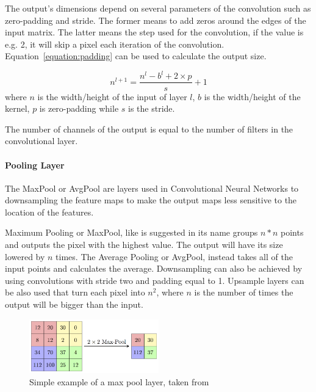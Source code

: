The output's dimensions depend on several parameters of the convolution such as
zero-padding and stride. The former means to add zeros around the edges of the
input matrix. The latter means the step used for the convolution, if the value
is e.g. 2, it will skip a pixel each iteration of the convolution.
Equation~\ref{equation:padding} can be used to calculate the output size.

\begin{equation} \label{equation:padding}
     n^{l+1} = \frac{n^{l}- b^{l}+2 \times p}{s} + 1
\end{equation}
where $n$ is the width/height of the input of layer $l$, $ b$ is the
width/height of the kernel, $p$ is zero-padding while $s$ is the stride.

The number of channels of the output is equal to the number of filters in the
convolutional layer.


\paragraph{Pooling Layer}

The MaxPool or AvgPool are layers used in Convolutional Neural Networks to
downsampling the feature maps to make the output maps less sensitive to the
location of the features.

Maximum Pooling or MaxPool, like is suggested in its name groups $ n * n $
points and outputs the pixel with the highest value.  The output will have its size
lowered by $n$ times.  The Average Pooling or AvgPool, instead takes all of
the input points and calculates the average. Downsampling can also be achieved
by using convolutions with stride two and padding equal to 1.  Upsample layers can
be also used that turn each pixel into $n^{2}$, where $n$ is the number of times
the output will be bigger than the input.

\begin{figure}[!htbp]
    \centering
    \includegraphics[width=0.5\textwidth]{Figures/maxpool.png}
    \caption{Simple example of a max pool layer, taken from~\cite{maxpoolimg}}
    \label{figure:maxpool}
\end{figure} 
 

